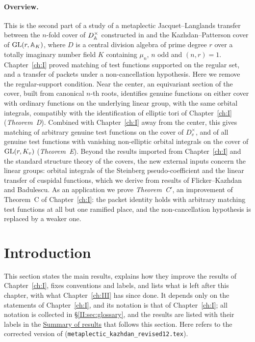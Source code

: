 \paragraph{Overview.} This is the second part of a study of a metaplectic Jacquet--Langlands transfer between the $n$-fold cover of $D^\times_{\mathbb{A}}$ constructed in \cite{JC26a} and the Kazhdan--Patterson cover of $\mathrm{GL}(r,\mathbb{A}_K)$, where $D$ is a central division algebra of prime degree $r$ over a totally imaginary number field $K$ containing $\mu_n$, $n$ odd and $(n,r)=1$. Chapter~\ref{ch:I} proved matching of test functions supported on the regular set, and a transfer of packets under a non-cancellation hypothesis. Here we remove the regular-support condition. Near the center, an equivariant section of the cover, built from canonical $n$-th roots, identifies genuine functions on either cover with ordinary functions on the underlying linear group, with the same orbital integrals, compatibly with the identification of elliptic tori of Chapter~\ref{ch:I} (\emph{Theorem~D}). Combined with Chapter~\ref{ch:I} away from the center, this gives matching of arbitrary genuine test functions on the cover of $D_v^\times$, and of all genuine test functions with vanishing non-elliptic orbital integrals on the cover of $\mathrm{GL}(r,K_v)$ (\emph{Theorem~E}). Beyond the results imported from Chapter~\ref{ch:I} and the standard structure theory of the covers, the new external inputs concern the linear groups: orbital integrals of the Steinberg pseudo-coefficient and the linear transfer of cuspidal functions, which we derive from results of Flicker--Kazhdan and Badulescu. As an application we prove \emph{Theorem~C$'$}, an improvement of Theorem~C of Chapter~\ref{ch:I}: the packet identity holds with arbitrary matching test functions at all but one ramified place, and the non-cancellation hypothesis is replaced by a weaker one.

\section{Introduction}\label{II:sec:intro}
This section states the main results, explains how they improve the results of Chapter~\ref{ch:I}, fixes conventions and labels, and lists what is left after this chapter, with what Chapter~\ref{ch:III} has since done. It depends only on the statements of Chapter~\ref{ch:I}, and its notation is that of Chapter~\ref{ch:I}; all notation is collected in \S\ref{II:sec:glossary}, and the results are listed with their labels in the \hyperref[II:sec:summary]{Summary of results} that follows this section. Here \cite{JC26a} refers to the corrected version of \cite{Jo88} (\texttt{metaplectic\_kazhdan\_revised12.tex}).

